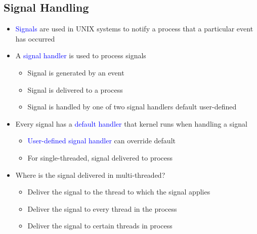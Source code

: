 \documentclass{book}
\begin{document}
            \subsection{Signal Handling}
                \begin{itemize}
                    \item \textcolor{blue}{Signals} are used in UNIX systems to notify a process that a particular event has occurred
                    \item A \textcolor{blue}{signal handler} is used to process signals
                        \begin{itemize}
                            \item Signal is generated by an event
                            \item Signal is delivered to a process
                            \item Signal is handled by one of two signal handlers
                                \subitem default
                                \subitem user-defined
                        \end{itemize}
                    \item Every signal has a \textcolor{blue}{default handler} that kernel runs when handling a signal
                        \begin{itemize}
                            \item \textcolor{blue}{User-defined signal handler} can override default
                            \item For single-threaded, signal delivered to process
                        \end{itemize}
                    \item Where is the signal delivered in multi-threaded?
                        \begin{itemize}
                            \item Deliver the signal to the thread to which the signal applies
                            \item Deliver the signal to every thread in the process
                            \item Deliver the signal to certain threads in process
                        \end{itemize}
                \end{itemize}
\end{document}
